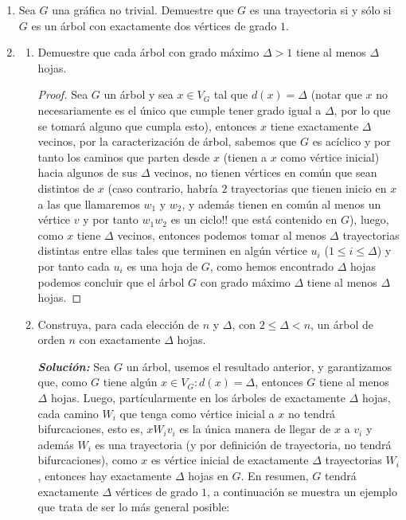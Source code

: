 \documentclass{article}
\begin{document}
\begin{enumerate}
  \item Sea $G$ una gr\'afica no trivial.   Demuestre
    que $G$ es una trayectoria si y s\'olo si $G$ es
    un \'arbol con exactamente dos v\'ertices de
    grado $1$.
    
  \item \begin{enumerate}
    \item Demuestre que cada \'arbol con grado m\'aximo
      $\Delta > 1$ tiene al menos $\Delta$ hojas.
      \renewcommand\qedsymbol{QED}
      \begin{proof}
      Sea $G$ un \'arbol y sea $x \in V_G$ tal que $d(x) = \Delta$ (notar que $x$
      no necesariamente es el \'unico que cumple tener grado igual a $\Delta$, por
      lo que se tomar\'a alguno que cumpla esto), entonces $x$ tiene exactamente
      $\Delta$ vecinos, por la caracterizaci\'on de \'arbol, sabemos que $G$ es
      ac\'iclico y por tanto los caminos que parten desde $x$ (tienen a $x$
      como v\'ertice inicial) hacia algunos de sus $\Delta$ vecinos, no tienen
      v\'ertices en com\'un que sean distintos de $x$ (caso contrario, habr\'ia $2$
      trayectorias que tienen inicio en $x$ a las que llamaremos $w_1$ y $w_2$, y
      adem\'as tienen en com\'un al menos un v\'ertice $v$ y por tanto $w_1 w_2$ es
      un ciclo!! que est\'a contenido en $G$), luego, como $x$ tiene $\Delta$ vecinos,
      entonces podemos tomar al menos $\Delta$ trayectorias distintas entre ellas
      tales que terminen en alg\'un v\'ertice $u_i$ ($1 \leq i \leq \Delta$) y por
      tanto cada $u_i$ es una hoja de $G$, como hemos encontrado $\Delta$ hojas
      podemos concluir que el \'arbol $G$ con grado m\'aximo $\Delta$ tiene al menos
      $\Delta$ hojas.
      \end{proof}
    \item Construya, para cada elecci\'on de $n$ y $\Delta$,
      con $2\le \Delta < n$, un \'arbol de orden $n$ con
      exactamente $\Delta$ hojas.
      
      \textbf{\textit{Soluci\'on:}} Sea $G$ un \'arbol, usemos el resultado anterior,
      y garantizamos que, como $G$ tiene alg\'un $x \in V_G : d(x) = \Delta$, entonces
      $G$ tiene al menos $\Delta$ hojas. Luego, part\'icularmente en los \'arboles de
      exactamente $\Delta$ hojas, cada camino $W_i$ que tenga como v\'ertice inicial a
      $x$ no tendr\'a bifurcaciones, esto es, $x W_i v_i$ es la \'unica manera de llegar
      de $x$ a $v_i$ y adem\'as $W_i$ es una trayectoria (y por definici\'on de trayectoria,
      no tendr\'a bifurcaciones), como $x$ es v\'ertice inicial de exactamente $\Delta$
      trayectorias $W_i$, entonces hay exactamente $\Delta$ hojas en $G$. En resumen, $G$
      tendr\'a exactamente $\Delta$ v\'ertices de grado $1$, a continuaci\'on se muestra
      un ejemplo que trata de ser lo m\'as general posible:
      

\end{enumerate}
\end{enumerate}
\end{document}
